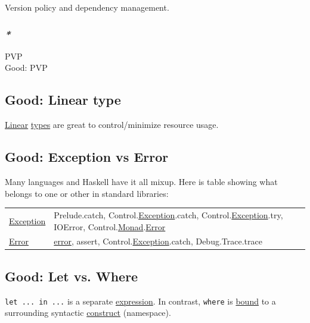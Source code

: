 \documentclass[11pt]{article}
\begin{document}
Version policy and dependency management.\\

\begin{center}

\end{center}

\subsubsection{\emph{*}}
\label{sec:org5dc64d1}

\label{org17fe40b}PVP\\
\label{org7292cf8}Good: PVP\\

\subsection{\label{orgc483657}Good: Linear type}
\label{sec:org80401a5}
\hyperref[orgb55e183]{Linear} \hyperref[org3927fd9]{types} are great to control/minimize resource usage.\\

\subsection{\label{org8ea76c0}Good: Exception vs Error}
\label{sec:org71151bc}
Many languages and Haskell have it all mixup. Here is table showing what belongs to one or other in standard libraries:\\

\begin{center}
\begin{tabular}{ll}
\hline
\hyperref[org15cd20b]{Exception} & Prelude.catch, Control.\hyperref[org15cd20b]{Exception}.catch, Control.\hyperref[org15cd20b]{Exception}.try, IOError, Control.\hyperref[org268aaf1]{Monad}.\hyperref[orgb69b647]{Error}\\
\hyperref[orgb69b647]{Error} & \hyperref[orgb69b647]{error}, assert, Control.\hyperref[org15cd20b]{Exception}.catch, Debug.Trace.trace\\
\end{tabular}
\end{center}

\subsection{\label{orge964376}Good: Let vs. Where}
\label{sec:orgc335e3e}
\texttt{let ... in ...} is a separate \hyperref[org667db83]{expression}. In contrast, \texttt{where} is \hyperref[org7d65bda]{bound} to a surrounding syntactic \hyperref[orgc1046f9]{construct} (namespace).\\
\end{document}
